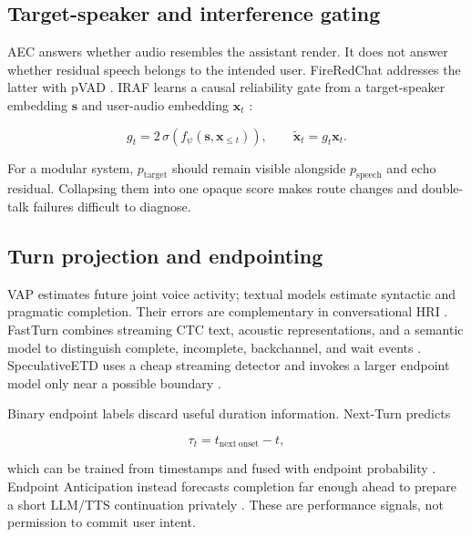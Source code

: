 \documentclass[11pt]{article}
\newcommand{\vect}[1]{\boldsymbol{#1}}
\begin{document}
\subsection{Target-speaker and interference gating}

AEC answers whether audio resembles the assistant render. It does not answer
whether residual speech belongs to the intended user. FireRedChat addresses the
latter with pVAD \citep{chen2025firered}. IRAF learns a causal reliability gate
from a target-speaker embedding $\vect s$ and user-audio embedding $\vect x_t$
\citep{zhong2026iraf}:

\begin{equation}
  g_t = 2\,\sigma\!\left(f_\psi(\vect s,\vect x_{\le t})\right),
  \qquad \tilde{\vect x}_t=g_t\vect x_t.
  \label{eq:iraf}
\end{equation}

For a modular system, $p_{\mathrm{target}}$ should remain visible alongside
$p_{\mathrm{speech}}$ and echo residual. Collapsing them into one opaque score
makes route changes and double-talk failures difficult to diagnose.

\subsection{Turn projection and endpointing}

VAP estimates future joint voice activity; textual models estimate syntactic
and pragmatic completion. Their errors are complementary in conversational HRI
\citep{skantze2025hri}. FastTurn combines streaming CTC text, acoustic
representations, and a semantic model to distinguish complete, incomplete,
backchannel, and wait events \citep{wang2026fastturn}. SpeculativeETD uses a
cheap streaming detector and invokes a larger endpoint model only near a
possible boundary \citep{ok2025speculative}.

Binary endpoint labels discard useful duration information. Next-Turn predicts

\begin{equation}
  \tau_t = t_{\mathrm{next\ onset}}-t,
  \label{eq:nextturn}
\end{equation}

which can be trained from timestamps and fused with endpoint probability
\citep{tsoi2026nextturn}. Endpoint Anticipation instead forecasts completion
far enough ahead to prepare a short LLM/TTS continuation privately
\citep{udupa2026anticipation}. These are performance signals, not permission to
commit user intent.
\end{document}
